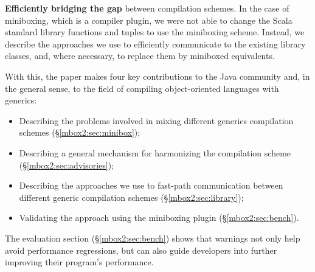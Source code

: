 \textbf{Efficiently bridging the gap} between compilation schemes. In the case of miniboxing, which is a compiler plugin, we were not able to change the Scala standard library functions and tuples to use the miniboxing scheme. Instead, we describe the approaches we use to efficiently communicate to the existing library classes, and, where necessary, to replace them by miniboxed equivalents.

With this, the paper makes four key contributions to the Java community and, in the general sense, to the field of compiling object-oriented languages with generics:

\begin{itemize}
  \item Describing the problems involved in mixing different generics compilation schemes (\S\ref{mbox2:sec:minibox});
  \item Describing a general mechanism for harmonizing the compilation scheme (\S\ref{mbox2:sec:advisories});
  \item Describing the approaches we use to fast-path communication between different generic compilation schemes (\S\ref{mbox2:sec:library});
  \item Validating the approach using the miniboxing plugin (\S\ref{mbox2:sec:bench}).
\end{itemize}

The evaluation section (\S\ref{mbox2:sec:bench}) shows that warnings not only help avoid performance regressions, but can also guide developers into further improving their program's performance.